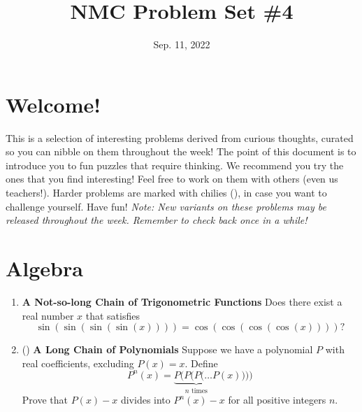 \documentclass[11pt]{scrartcl}
\begin{document}
\title{NMC Problem Set \#4}
\date{Sep. 11, 2022} 
\maketitle

\section*{Welcome!}

This is a selection of interesting problems derived from curious thoughts, curated so you can nibble on them throughout the week! The point of this document is to introduce you to fun puzzles that require thinking. We recommend you try the ones that you find interesting! Feel free to work on them with others (even us teachers!). Harder problems are marked with chilies (\fullchili), in case you want to challenge yourself.
\newline\newline
Have fun! \textit{Note: New variants on these problems may be released throughout the week. Remember to check back once in a while!}
    
\section{Algebra}
\begin{enumerate}[label=\textbf{A\arabic*}.]
    \item \textbf{A Not-so-long Chain of Trigonometric Functions} \newline
    Does there exist a real number $x$ that satisfies
    \[ \sin(\sin(\sin(\sin(x)))) = \cos(\cos(\cos(\cos(x))))? \]

    \item (\fullchili) \textbf{A Long Chain of Polynomials} \newline
    Suppose we have a polynomial $P$ with real coefficients, excluding $P(x) = x$. Define
    \[ P^n(x) = \underbrace{P(P(P(\dots P}_{n \text{ times}}(x)))) \]
    Prove that $P(x) - x$ divides into $P^n(x) - x$ for all positive integers $n$.
\end{enumerate}

\newpage
\end{document}
